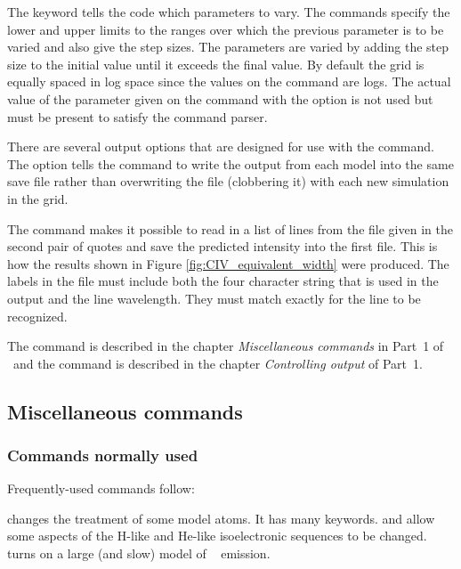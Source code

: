 \documentclass[12pt,twoside]{article}
\begin{document}
{The  keyword tells the code
which parameters to vary.  The 
commands specify the lower and upper limits to the ranges over which the
previous parameter is to be varied and also give the step sizes.  The
parameters are varied by adding the step size to the initial value until
it exceeds the final value.  By default the grid is equally spaced in log space since
the values on the  command are
logs.  The actual value of the parameter
given on the command with the 
option is not used but must be present to satisfy the command parser.

There are several output options that are designed for use
with the  command.
The  option tells the 
command to write the output from each
model into the same save file rather than overwriting the file (clobbering
it) with each new simulation in the grid.

The  command makes
it possible to read in a list of lines
from the file given in the second pair of quotes and save the predicted
intensity into the first file.
This is how the results shown in Figure \ref{fig:CIV_equivalent_width}
were produced.
The labels in the file must include both the four character
string that is used in the output and the line wavelength.  They must match
exactly for the line to be recognized.

The  command is described
in the chapter \emph{Miscellaneous commands} in
Part~1 of \Hazy\ and the  command is described in the chapter
\emph{Controlling output} of Part~1.

\subsection{Miscellaneous commands}

\subsubsection{Commands normally used}

Frequently-used commands follow:

 changes the treatment of
some model atoms.  It has many keywords.
 and 
allow some aspects of the H-like and He-like
isoelectronic sequences to be changed.  
turns on a large (and slow) model of \htwo\ \citep{Shaw2005} emission.

}
\end{document}
